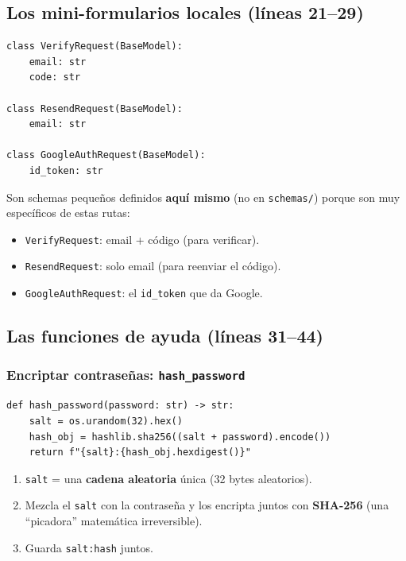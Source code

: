 \documentclass[11pt,a4paper]{article}
\begin{document}
\subsection{Los mini-formularios locales (líneas 21--29)}

\begin{lstlisting}
class VerifyRequest(BaseModel):
    email: str
    code: str

class ResendRequest(BaseModel):
    email: str

class GoogleAuthRequest(BaseModel):
    id_token: str
\end{lstlisting}

Son schemas pequeños definidos \textbf{aquí mismo} (no en \texttt{schemas/}) porque son
muy específicos de estas rutas:
\begin{itemize}
    \item \texttt{VerifyRequest}: email + código (para verificar).
    \item \texttt{ResendRequest}: solo email (para reenviar el código).
    \item \texttt{GoogleAuthRequest}: el \texttt{id\_token} que da Google.
\end{itemize}

\subsection{Las funciones de ayuda (líneas 31--44)}

\subsubsection{Encriptar contraseñas: \texttt{hash\_password}}

\begin{lstlisting}
def hash_password(password: str) -> str:
    salt = os.urandom(32).hex()
    hash_obj = hashlib.sha256((salt + password).encode())
    return f"{salt}:{hash_obj.hexdigest()}"
\end{lstlisting}

\begin{enumerate}
    \item \texttt{salt} = una \textbf{cadena aleatoria} única (32 bytes aleatorios).
    \item Mezcla el \texttt{salt} con la contraseña y los encripta juntos con \textbf{SHA-256}
    (una ``picadora'' matemática irreversible).
    \item Guarda \texttt{salt:hash} juntos.
\end{enumerate}
\end{document}

